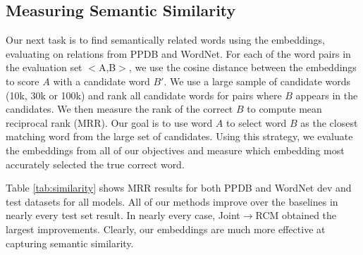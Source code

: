 \documentclass[11pt]{article}
\newcommand{\secref}[1]{Section~\ref{#1}}
\begin{document}
\subsection{Measuring Semantic Similarity}
Our next task is to find semantically related words using the embeddings, evaluating on relations from 
PPDB and WordNet. For each of the word pairs
in the evaluation set $<$A,B$>$, we use the cosine distance between the embeddings
to score $A$ with a candidate word $B'$.
We use a large sample of candidate words (10k, 30k or 100k)
and rank all candidate words for pairs where $B$ appears in the candidates.
We then measure the rank of the correct $B$
to compute mean reciprocal rank (MRR). Our goal is to use word $A$ to select word $B$
as the closest matching word from the large set of candidates.
Using this strategy, we evaluate the embeddings from all of our objectives
and measure which embedding most accurately selected the true correct word.

Table \ref{tab:similarity} shows MRR results for both PPDB and WordNet dev and test datasets
for all models. All of our methods improve over the baselines in nearly every test set result.
In nearly every case, Joint$\rightarrow$RCM obtained the largest improvements. Clearly,
our embeddings are much more effective at capturing semantic similarity.






%
%
%
\end{document}
